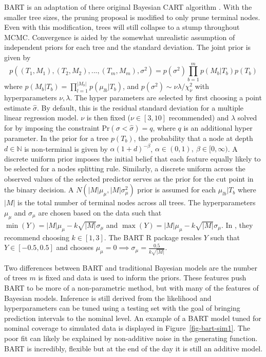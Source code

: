 \documentclass[
  12pt,
  letterpaper,
  DIV=11,
  numbers=noendperiod]{scrartcl}
\begin{document}
BART is an adaptation of there original Bayesian CART algorithm
\citep{bayes_cart}. With the smaller tree sizes, the pruning proposal is
modified to only prune terminal nodes. Even with this modification,
trees will still collapse to a stump throughout MCMC. Convergence is
aided by the somewhat unrealistic assumption of independent priors for
each tree and the standard deviation. The joint prior is given by
\[p((T_1, M_1), (T_2, M_2),...,(T_m, M_m),\sigma^2)=p(\sigma^2)\prod_{b=1}^mp(M_b|T_b)p(T_b)\]
where \(p(M_b|T_b)=\prod_{l=1}^{|M_b|}p(\mu_{lb}|T_b)\), and
\(p(\sigma^2)\sim\nu\lambda/\chi^2_\nu\) with hyperparameters
\(\nu,\lambda\). The hyper parameters are selected by first choosing a
point estimate \(\hat\sigma\). By default, this is the residual standard
deviation for a multiple linear regression model. \(\nu\) is then fixed
(\(\nu\in[3,10]\) recommended) and \(\lambda\) solved for by imposing
the constraint \(\text{Pr}(\sigma<\hat\sigma)=q\), where \(q\) is an
additional hyper parameter. In the prior for a tree \(p(T_b)\), the
probability that a node at depth \(d\in\mathbb{N}\) is non-terminal is
given by \(\alpha(1+d)^{-\beta}\),
\(\alpha\in(0,1),\ \beta\in[0,\infty)\). A discrete uniform prior
imposes the initial belief that each feature equally likely to be
selected for a nodes splitting rule. Similarly, a discrete uniform
across the observed values of the selected predictor serves as the prior
for the cut point in the binary decision. A
\(N(|M|\mu_\mu,|M|\sigma^2_\mu)\) prior is assumed for each
\(\mu_{lb}|T_b\) where \(|M|\) is the total number of terminal nodes
across all trees. The hyperparameters \(\mu_\mu\) and \(\sigma_\mu\) are
chosen based on the data such that
\(\min(Y)=|M|\mu_\mu-k\sqrt{|M|}\sigma_\mu\) and
\(\max(Y)=|M|\mu_\mu-k\sqrt{|M|}\sigma_\mu\). In \citep{bart_paper},
they recommend choosing \(k\in[1,3]\). The BART R package \citep{bart_r}
resales \(Y\) such that \(Y\in[-0.5, 0.5]\) and chooses
\(\mu_\mu=0\implies\sigma_\mu=\frac{0.5}{k\sqrt{|M|}}\).

Two differences between BART and traditional Bayesian models are the
number of trees \(m\) is fixed and data is used to inform the priors.
These features push BART to be more of a non-parametric method, but with
many of the features of Bayesian models. Inference is still derived from
the likelihood and hyperparameters can be tuned using a testing set with
the goal of bringing prediction intervals to the nominal level. An
example of a BART model tuned for nominal coverage to simulated data is
displayed in Figure~\ref{fig-bart-sim1}. The poor fit can likely be
explained by non-additive noise in the generating function. BART is
incredibly, flexible but at the end of the day it is still an additive
model.
\end{document}
